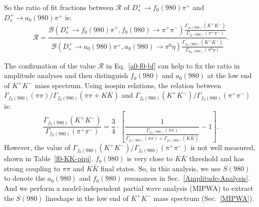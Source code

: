 {    So the ratio of fit fractions between $\mathcal{R}$ of $D_{s}^{+} \rightarrow f_{0}(980)\pi^{+}$ and $D_{s}^{+} \rightarrow a_{0}(980)\pi^{+}$ is: 
    \begin{equation}
        \mathcal{R}  =\frac{\mathcal{B}(D_{s}^{+} \rightarrow f_{0}(980)\pi^{+}, f_{0}(980) \rightarrow \pi^{+}\pi^{-})  \frac{\Gamma_{f_{0}(980)}(K^{+}K^{-})}{ \Gamma_{f_{0}(980)}(\pi^{+}\pi^{-})}}{\mathcal{B}(D_{s}^{+} \rightarrow a_{0}(980)\pi^{+}, a_{0}(980) \rightarrow \pi^{0}\eta)  \frac{\Gamma_{a_{0}(980)}(K^{+}K^{-})}{ \Gamma_{a_{0}(980)}(\pi^{0}\eta)}}. \label{a0-f0-bf}
    \end{equation}
    
    The confirmation of the value $\mathcal{R}$ in Eq.~\ref{a0-f0-bf} can help to fix the ratio in amplitude analyses and then distinguish $f_{0}(980)$ and $a_{0}(980)$ at the low end of $K^{+}K^{-}$ mass spectrum.
    Using isospin relations,  the relation between $\Gamma_{f_{0}(980)}(\pi\pi) /  \Gamma_{f_{0}(980)}(\pi\pi+K\bar{K})$ and $\Gamma_{f_{0}(980)}(K^{+}K^{-}) / \Gamma_{f_{0}(980)}(\pi^{+}\pi^{-})$ is:
    \begin{equation}
        \frac{\Gamma_{f_{0}(980)}(K^{+}K^{-})}{ \Gamma_{f_{0}(980)}(\pi^{+}\pi^{-})} =  \frac{3}{4} \cdot \left[\frac{1}{\frac{\Gamma_{f_{0}(980)}(\pi\pi)} {\Gamma_{f_{0}(980)}(\pi\pi)+\Gamma_{f_{0}(980)}(K\bar{K})}} -1\right]. \label{f0-KK-pipi-relation}
    \end{equation}
    However, the value of $\Gamma_{f_{0}(980)}(K^{+}K^{-}) / \Gamma_{f_{0}(980)}(\pi^{+}\pi^{-})$ is not well measured, shown in Table~\ref{f0-KK-pipi}. %
    $f_{0}(980)$ is very close to $K\bar{K}$ threshold and has strong coupling to $\pi\pi$ and $K\bar{K}$ final states.
    So, in this analysis, we use $S(980)$ to denote the $a_{0}(980)$ and $f_{0}(980)$ resonances in Sec.~\ref{Amplitude-Analysis}.
    And we perform a model-independent partial wave analysis (MIPWA) to extract the $S(980)$ lineshape in the low end of $K^{+}K^{-}$ mass spectrum (Sec.~\ref{MIPWA}). %
    

}
